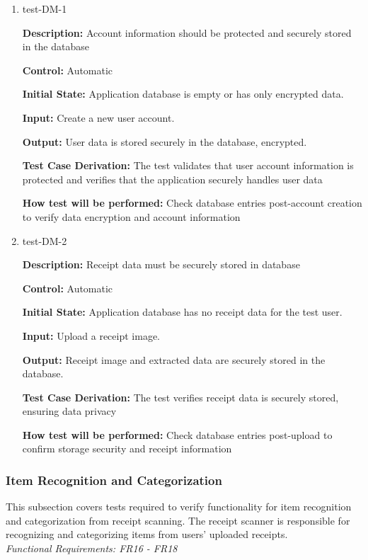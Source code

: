 \documentclass[12pt, titlepage]{article}
\begin{document}
\begin{enumerate}
\item{test-DM-1\\}

\textbf{Description:} Account information should be protected and securely stored in the database

\textbf{Control:} Automatic

\textbf{Initial State:} Application database is empty or has only encrypted data.

\textbf{Input:} Create a new user account.

\textbf{Output:} User data is stored securely in the database, encrypted.

\textbf{Test Case Derivation:} The test validates that user account information is protected and verifies that the application securely handles user data

\textbf{How test will be performed:} Check database entries post-account creation to verify data encryption and account information

\item{test-DM-2\\}

\textbf{Description:} Receipt data must be securely stored in database

\textbf{Control:} Automatic

\textbf{Initial State:} Application database has no receipt data for the test user.

\textbf{Input:} Upload a receipt image.

\textbf{Output:} Receipt image and extracted data are securely stored in the database.

\textbf{Test Case Derivation:} The test verifies receipt data is securely stored, ensuring data privacy

\textbf{How test will be performed:} Check database entries post-upload to confirm storage security and receipt information
\end{enumerate}

\subsubsection{Item Recognition and Categorization}

This subsection covers tests required to verify functionality for item recognition and categorization from receipt scanning. The receipt scanner is responsible for recognizing and categorizing items from users' uploaded receipts.\\
\textit{Functional Requirements: FR16 - FR18}
\end{document}
